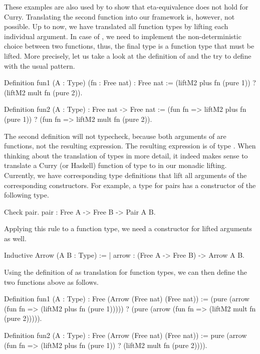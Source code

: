 These examples are also used by \citet{mehner2014parametricity} to show that eta\--equivalence does not hold for Curry.
Translating the second function into our framework is, however, not possible.
Up to now, we have translated all function types by lifting each individual argument.
In case of , we need to implement the non\--deterministic choice between two functions, thus, the final type is a function type that must be lifted.
More precisely, let us take a look at the definition of  and the try to define  with the usual pattern.

\begin{coqcode}
Definition fun1 (A : Type) (fn : Free nat) : Free nat :=
  (liftM2 plus fn (pure 1)) ? (liftM2 mult fn (pure 2)).

Definition fun2 (A : Type) : Free nat -> Free nat :=
  (fun fn => liftM2 plus fn (pure 1)) ? (fun fn => liftM2 mult fn (pure 2)).
\end{coqcode}

The second definition will not typecheck, because both arguments of  are functions, not the resulting expression.
The resulting expression is of type .
When thinking about the translation of types in more detail, it indeed makes sense to translate a Curry (or Haskell) function of type  to  in our monadic lifting.
Currently, we have corresponding type definitions that lift all arguments of the corresponding constructors.
For example, a type for pairs has a constructor  of the following type.

\begin{crepl}
\coqrepl Check pair.
  pair : Free A -> Free B -> Pair A B.
\end{crepl}

Applying this rule to a function type, we need a constructor for lifted arguments as well.

\begin{coqcode}
Inductive Arrow (A B : Type) :=
| arrow : (Free A -> Free B) -> Arrow A B.
\end{coqcode}

Using the definition of  as translation for function types, we can then define the two functions above as follows.

\begin{coqcode}
Definition fun1 (A : Type) :  Free (Arrow (Free nat) (Free nat)) :=
  (pure (arrow (fun fn => (liftM2 plus fn (pure 1))))) ?
  (pure (arrow (fun fn => (liftM2 mult fn (pure 2))))).

Definition fun2 (A : Type) : Free (Arrow (Free nat) (Free nat)) :=
  pure (arrow (fun fn => (liftM2 plus fn (pure 1))
                       ? (liftM2 mult fn (pure 2)))).
\end{coqcode}

